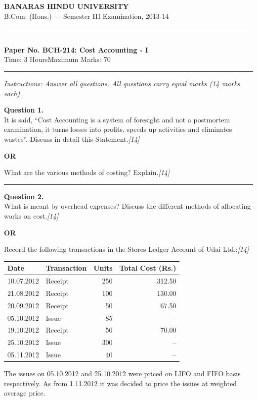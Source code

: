 \documentclass[11pt,a4paper]{article}
\newcommand{\pts}[1]{\hfill   \textit{[#1]}}
\begin{document}
\begin{center}
  {\large\bfseries BANARAS HINDU UNIVERSITY}\\[2pt]
  {\normalsize B.Com. (Hons.) --- Semester III Examination, 2013-14}\\[6pt]
  \rule{0.8\linewidth}{0.5pt}\\[6pt]
  {\large\bfseries Paper No. BCH-214: Cost Accounting - I}\\[4pt]
  {\normalsize Time: 3 Hours\hfill Maximum Marks: 70}
\end{center}

\rule{\linewidth}{0.4pt}

\smallskip



\noindent   \textit{Instructions: Answer all questions. All questions carry equal marks (14 marks each).}

\bigskip




\noindent   \textbf{Question 1.} \\
It is said, ``Cost Accounting is a system of foresight and not a postmortem examination, it turns losses into profits, speeds up activities and eliminates wastes''. Discuss in detail this Statement.\pts{14}

\centerline{   \textbf{OR}}

What are the various methods of costing? Explain.\pts{14}

\medskip\rule{\linewidth}{0.2pt}




\noindent   \textbf{Question 2.} \\
What is meant by overhead expenses? Discuss the different methods of allocating works on cost.\pts{14}

\centerline{   \textbf{OR}}

Record the following transactions in the Stores Ledger Account of Udai Ltd.:\pts{14}

\begin{center}
\renewcommand{\arraystretch}{1.2}

\begin{tabular}{|l|l|r|r|}
\hline
   \textbf{Date} &   \textbf{Transaction} &   \textbf{Units} &   \textbf{Total Cost (Rs.)} \\ \hline
10.07.2012 & Receipt & 250 & 312.50 \\
21.08.2012 & Receipt & 100 & 130.00 \\
20.09.2012 & Receipt & 50 & 67.50 \\
05.10.2012 & Issue & 85 & -- \\
19.10.2012 & Receipt & 50 & 70.00 \\
25.10.2012 & Issue & 300 & -- \\
05.11.2012 & Issue & 40 & -- \\ \hline
\end{tabular}
\end{center}
The issues on 05.10.2012 and 25.10.2012 were priced on LIFO and FIFO basis respectively. As from 1.11.2012 it was decided to price the issues at weighted average price.
\end{document}
